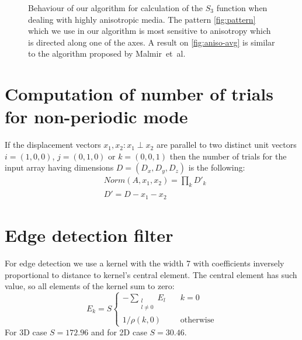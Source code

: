\documentclass[1p]{elsarticle}
\begin{document}
\begin{figure}[tp]
  \hfill
  \caption[]{Behaviour of our algorithm for calculation of the $S_3$ function
    when dealing with highly anisotropic media. The pattern \cref{fig:pattern}
    which we use in our algorithm is most sensitive to anisotropy which is
    directed along one of the axes. A result on \cref{fig:aniso-avg} is similar
    to the algorithm proposed by Malmir~et~al.}
  \label{fig:aniso}
\end{figure}

\appendix
\section{Computation of number of trials for non-periodic mode}
\label{sec:number-of-trials}
If the displacement vectors $x_1, x_2: x_1 \perp x_2$ are parallel to two
distinct unit vectors $i=(1,0,0)$, $j=(0,1,0)$ or $k=(0,0,1)$ then the number of
trials for the input array having dimensions $D = (D_x, D_y, D_z)$ is the
following:
\begin{equation}
  \begin{aligned}
    & Norm(A, x_1, x_2) = \prod_k D'_k \\
    & D' = D - x_1 - x_2
  \end{aligned}
\end{equation}

\section{Edge detection filter}
\label{sec:filter}
For edge detection we use a kernel with the width 7 with coefficients inversely
proportional to distance to kernel's central element. The central element has
such value, so all elements of the kernel sum to zero:
\begin{equation}
  E_k = S \left\{
  \begin{array}{ll}
    -\sum\limits_{\substack{l \\ l \ne 0}} E_l & \quad k = 0 \\
    1 / \rho(k, 0) & \quad \text{otherwise}
  \end{array}
  \right.
\end{equation}
For 3D case $S=172.96$ and for 2D case $S=30.46$.


\end{document}
